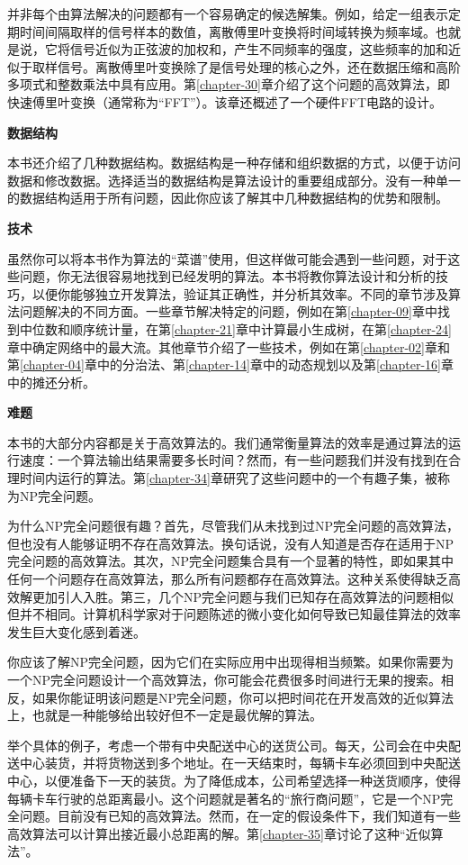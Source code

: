 \documentclass[lang=cn,newtx,10pt,scheme=chinese]{elegantbook}
\begin{document}
并非每个由算法解决的问题都有一个容易确定的候选解集。例如，给定一组表示定期时间间隔取样的信号样本的数值，离散傅里叶变换将时间域转换为频率域。也就是说，它将信号近似为正弦波的加权和，产生不同频率的强度，这些频率的加和近似于取样信号。离散傅里叶变换除了是信号处理的核心之外，还在数据压缩和高阶多项式和整数乘法中具有应用。第\ref{chapter-30}章介绍了这个问题的高效算法，即快速傅里叶变换（通常称为``FFT''）。该章还概述了一个硬件FFT电路的设计。

\textbf{数据结构}

本书还介绍了几种数据结构。数据结构是一种存储和组织数据的方式，以便于访问数据和修改数据。选择适当的数据结构是算法设计的重要组成部分。没有一种单一的数据结构适用于所有问题，因此你应该了解其中几种数据结构的优势和限制。

\textbf{技术}

虽然你可以将本书作为算法的``菜谱''使用，但这样做可能会遇到一些问题，对于这些问题，你无法很容易地找到已经发明的算法。本书将教你算法设计和分析的技巧，以便你能够独立开发算法，验证其正确性，并分析其效率。不同的章节涉及算法问题解决的不同方面。一些章节解决特定的问题，例如在第\ref{chapter-09}章中找到中位数和顺序统计量，在第\ref{chapter-21}章中计算最小生成树，在第\ref{chapter-24}章中确定网络中的最大流。其他章节介绍了一些技术，例如在第\ref{chapter-02}章和第\ref{chapter-04}章中的分治法、第\ref{chapter-14}章中的动态规划以及第\ref{chapter-16}章中的摊还分析。

\textbf{难题}

本书的大部分内容都是关于高效算法的。我们通常衡量算法的效率是通过算法的运行速度：一个算法输出结果需要多长时间？然而，有一些问题我们并没有找到在合理时间内运行的算法。第\ref{chapter-34}章研究了这些问题中的一个有趣子集，被称为NP完全问题。

为什么NP完全问题很有趣？首先，尽管我们从未找到过NP完全问题的高效算法，但也没有人能够证明不存在高效算法。换句话说，没有人知道是否存在适用于NP完全问题的高效算法。其次，NP完全问题集合具有一个显著的特性，即如果其中任何一个问题存在高效算法，那么所有问题都存在高效算法。这种关系使得缺乏高效解更加引人入胜。第三，几个NP完全问题与我们已知存在高效算法的问题相似但并不相同。计算机科学家对于问题陈述的微小变化如何导致已知最佳算法的效率发生巨大变化感到着迷。

你应该了解NP完全问题，因为它们在实际应用中出现得相当频繁。如果你需要为一个NP完全问题设计一个高效算法，你可能会花费很多时间进行无果的搜索。相反，如果你能证明该问题是NP完全问题，你可以把时间花在开发高效的近似算法上，也就是一种能够给出较好但不一定是最优解的算法。

举个具体的例子，考虑一个带有中央配送中心的送货公司。每天，公司会在中央配送中心装货，并将货物送到多个地址。在一天结束时，每辆卡车必须回到中央配送中心，以便准备下一天的装货。为了降低成本，公司希望选择一种送货顺序，使得每辆卡车行驶的总距离最小。这个问题就是著名的``旅行商问题''，它是一个NP完全问题。目前没有已知的高效算法。然而，在一定的假设条件下，我们知道有一些高效算法可以计算出接近最小总距离的解。第\ref{chapter-35}章讨论了这种``近似算法''。
\end{document}

